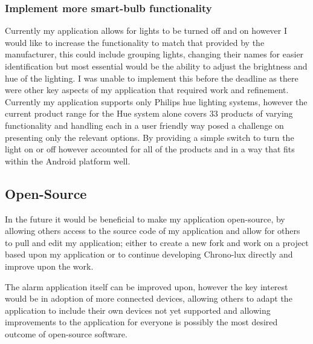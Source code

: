 \subsubsection{Implement more smart-bulb
functionality}\label{implement-more-smart-bulb-functionality}

Currently my application allows for lights to be turned off and on
however I would like to increase the functionality to match that
provided by the manufacturer, this could include grouping lights,
changing their names for easier identification but most essential would
be the ability to adjust the brightness and hue of the lighting. I was
unable to implement this before the deadline as there were other key
aspects of my application that required work and refinement. Currently
my application supports only Philips hue lighting systems, however the
current product range for the Hue system alone covers 33 products of
varying functionality and handling each in a user friendly way posed a
challenge on presenting only the relevant options. By providing a simple
switch to turn the light on or off however accounted for all of the
products and in a way that fits within the Android platform well.

\subsection{Open-Source}\label{open-source}

In the future it would be beneficial to make my application open-source,
by allowing others access to the source code of my application and allow
for others to pull and edit my application; either to create a new fork
and work on a project based upon my application or to continue
developing Chrono-lux directly and improve upon the work.

The alarm application itself can be improved upon, however the key
interest would be in adoption of more connected devices, allowing others
to adapt the application to include their own devices not yet supported
and allowing improvements to the application for everyone is possibly
the most desired outcome of open-source software.
